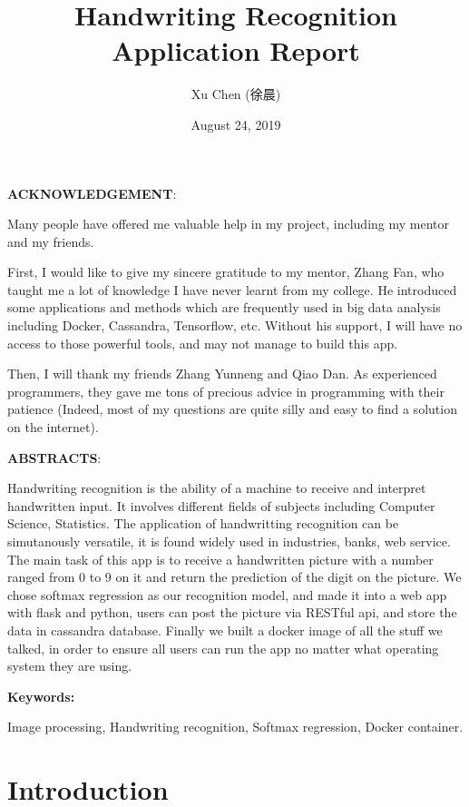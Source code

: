 \documentclass[12pt,hyperref,]{ctexart}
\title{Handwriting Recognition Application Report}
\author{Xu Chen (徐晨)}
\date{August 24, 2019}
\begin{document}
\maketitle

{
\setcounter{tocdepth}{2}
\tableofcontents
}
\newpage

\noindent\textbf{ACKNOWLEDGEMENT}:

Many people have offered me valuable help in my project, including my
mentor and my friends.

First, I would like to give my sincere gratitude to my mentor, Zhang
Fan, who taught me a lot of knowledge I have never learnt from my
college. He introduced some applications and methods which are
frequently used in big data analysis including Docker, Cassandra,
Tensorflow, etc. Without his support, I will have no access to those
powerful tools, and may not manage to build this app.

Then, I will thank my friends Zhang Yunneng and Qiao Dan. As experienced
programmers, they gave me tons of precious advice in programming with
their patience (Indeed, most of my questions are quite silly and easy to
find a solution on the internet).

\newpage

\noindent\textbf{ABSTRACTS}:

Handwriting recognition is the ability of a machine to receive and
interpret handwritten input. It involves different fields of subjects
including Computer Science, Statistics. The application of handwritting
recognition can be simutanously versatile, it is found widely used in
industries, banks, web service. The main task of this app is to receive
a handwritten picture with a number ranged from 0 to 9 on it and return
the prediction of the digit on the picture. We chose softmax regression
as our recognition model, and made it into a web app with flask and
python, users can post the picture via RESTful api, and store the data
in cassandra database. Finally we built a docker image of all the stuff
we talked, in order to ensure all users can run the app no matter what
operating system they are using.

\vspace{1.5cm} \textbf{Keywords:}

Image processing, Handwriting recognition, Softmax regression, Docker
container.

\newpage

\section{Introduction}\label{introduction}
\end{document}
